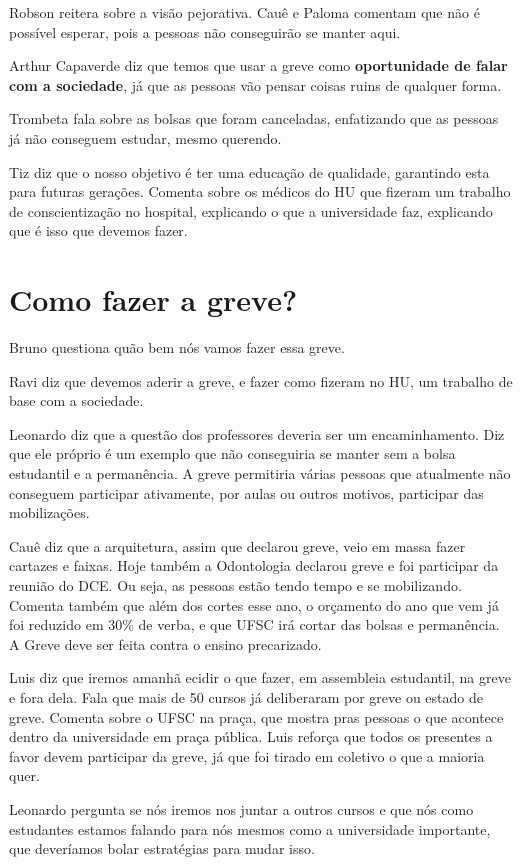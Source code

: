 \documentclass{ata-calico}
\begin{document}
Robson reitera sobre a visão pejorativa. Cauê e Paloma comentam que não é possível esperar, pois a pessoas não conseguirão se manter aqui. 

Arthur Capaverde diz que temos que usar a greve como \textbf{oportunidade de falar com a sociedade}, já que as pessoas vão pensar coisas ruins de qualquer forma. 

Trombeta fala sobre as bolsas que foram canceladas, enfatizando que as pessoas já não conseguem estudar, mesmo querendo. 

Tiz diz que o nosso objetivo é ter uma educação de qualidade, garantindo esta para futuras gerações. Comenta sobre os médicos do HU que fizeram um trabalho de conscientização no hospital, explicando o que a universidade faz, explicando que é isso que devemos fazer.

\section{Como fazer a greve?}
Bruno questiona quão bem nós vamos fazer essa greve.

Ravi diz que devemos aderir a greve, e fazer como fizeram no HU, um trabalho de base com a sociedade. 

Leonardo diz que a questão dos professores deveria ser um encaminhamento. Diz que ele próprio é um exemplo que não conseguiria se manter sem a bolsa estudantil e a permanência. A greve permitiria várias pessoas que atualmente não conseguem participar ativamente, por aulas ou outros motivos, participar das mobilizações.

Cauê diz que a arquitetura, assim que declarou greve, veio em massa fazer cartazes e faixas. Hoje também a Odontologia declarou greve e foi participar da reunião do DCE. Ou seja, as pessoas estão tendo tempo e se mobilizando. Comenta também que além dos cortes esse ano, o orçamento do ano que vem já foi reduzido em 30\% de verba, e que UFSC irá cortar das bolsas e permanência. A Greve deve ser feita contra o ensino precarizado.

Luis diz que iremos amanhã ecidir o que fazer, em assembleia estudantil, na greve e fora dela. Fala que mais de 50 cursos já deliberaram por greve ou estado de greve. Comenta sobre o UFSC na praça, que mostra pras pessoas o que acontece dentro da universidade em praça pública. Luis reforça que todos os presentes a favor devem participar da greve, já que foi tirado em coletivo o que a maioria quer. 

Leonardo pergunta se nós iremos nos juntar a outros cursos e que nós como estudantes estamos falando para nós mesmos como a universidade importante, que deveríamos bolar estratégias para mudar isso. 
\end{document}
